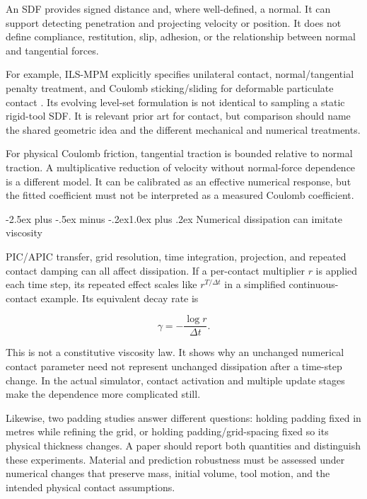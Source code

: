 \documentclass[
  11pt,
]{article}
\makeatletter
\renewcommand\subsection{\needspace{5\baselineskip}\@startsection{subsection}{2}{\z@}%
  {-2.5ex plus -.5ex minus -.2ex}{1.0ex plus .2ex}%
  {\normalfont\sffamily\large\bfseries\color{accent}}}
\makeatother
\begin{document}
An SDF provides signed distance and, where well-defined, a normal. It
can support detecting penetration and projecting velocity or position.
It does not define compliance, restitution, slip, adhesion, or the
relationship between normal and tangential forces.

For example, ILS-MPM explicitly specifies unilateral contact,
normal/tangential penalty treatment, and Coulomb sticking/sliding for
deformable particulate contact . Its
evolving level-set formulation is not identical to sampling a static
rigid-tool SDF. It is relevant prior art for contact, but comparison
should name the shared geometric idea and the different mechanical and
numerical treatments.

For physical Coulomb friction, tangential traction is bounded relative
to normal traction. A multiplicative reduction of velocity without
normal-force dependence is a different model. It can be calibrated as an
effective numerical response, but the fitted coefficient must not be
interpreted as a measured Coulomb coefficient.

\subsection{Numerical dissipation can imitate
viscosity}\label{numerical-dissipation-can-imitate-viscosity}

PIC/APIC transfer, grid resolution, time integration, projection, and
repeated contact damping can all affect dissipation. If a per-contact
multiplier \(r\) is applied each time step, its repeated effect scales
like \(r^{T/\Delta t}\) in a simplified continuous-contact example. Its
equivalent decay rate is

\[
\gamma=-\frac{\log r}{\Delta t}.
\]

This is not a constitutive viscosity law. It shows why an unchanged
numerical contact parameter need not represent unchanged dissipation
after a time-step change. In the actual simulator, contact activation
and multiple update stages make the dependence more complicated still.

Likewise, two padding studies answer different questions: holding
padding fixed in metres while refining the grid, or holding
padding/grid-spacing fixed so its physical thickness changes. A paper
should report both quantities and distinguish these experiments.
Material and prediction robustness must be assessed under numerical
changes that preserve mass, initial volume, tool motion, and the
intended physical contact assumptions.
\end{document}
